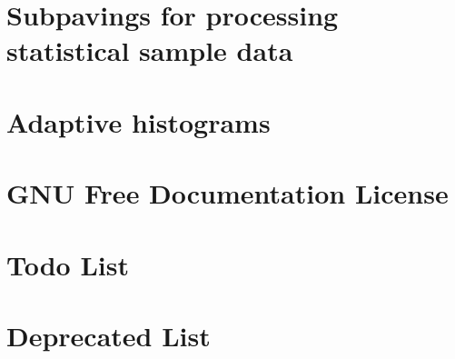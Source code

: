 \documentclass[a4paper]{article}
\begin{document}
\section{\-Subpavings for processing statistical sample data}
\label{StatsSubPavings}
\hypertarget{StatsSubPavings}{}

\section{\-Adaptive histograms}
\label{AdaptiveHistograms}
\hypertarget{AdaptiveHistograms}{}

\section{\-G\-N\-U \-Free \-Documentation \-License}
\label{GFDL}
\hypertarget{GFDL}{}

\section{\-Todo \-List}
\label{todo}
\hypertarget{todo}{}

\section{\-Deprecated \-List}
\label{deprecated}
\hypertarget{deprecated}{}

\end{document}
